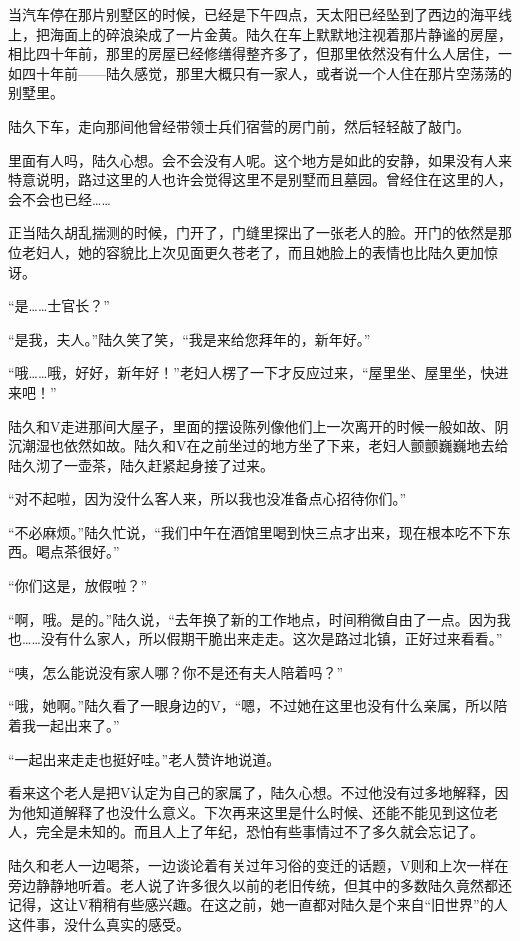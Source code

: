 当汽车停在那片别墅区的时候，已经是下午四点，天太阳已经坠到了西边的海平线上，把海面上的碎浪染成了一片金黄。陆久在车上默默地注视着那片静谧的房屋，相比四十年前，那里的房屋已经修缮得整齐多了，但那里依然没有什么人居住，一如四十年前——陆久感觉，那里大概只有一家人，或者说一个人住在那片空荡荡的别墅里。

陆久下车，走向那间他曾经带领士兵们宿营的房门前，然后轻轻敲了敲门。

里面有人吗，陆久心想。会不会没有人呢。这个地方是如此的安静，如果没有人来特意说明，路过这里的人也许会觉得这里不是别墅而且墓园。曾经住在这里的人，会不会也已经……

正当陆久胡乱揣测的时候，门开了，门缝里探出了一张老人的脸。开门的依然是那位老妇人，她的容貌比上次见面更久苍老了，而且她脸上的表情也比陆久更加惊讶。

“是……士官长？”

“是我，夫人。”陆久笑了笑，“我是来给您拜年的，新年好。”

“哦……哦，好好，新年好！”老妇人楞了一下才反应过来，“屋里坐、屋里坐，快进来吧！”

陆久和V走进那间大屋子，里面的摆设陈列像他们上一次离开的时候一般如故、阴沉潮湿也依然如故。陆久和V在之前坐过的地方坐了下来，老妇人颤颤巍巍地去给陆久沏了一壶茶，陆久赶紧起身接了过来。

“对不起啦，因为没什么客人来，所以我也没准备点心招待你们。”

“不必麻烦。”陆久忙说，“我们中午在酒馆里喝到快三点才出来，现在根本吃不下东西。喝点茶很好。”

“你们这是，放假啦？”

“啊，哦。是的。”陆久说，“去年换了新的工作地点，时间稍微自由了一点。因为我也……没有什么家人，所以假期干脆出来走走。这次是路过北镇，正好过来看看。”

“咦，怎么能说没有家人哪？你不是还有夫人陪着吗？”

“哦，她啊。”陆久看了一眼身边的V，“嗯，不过她在这里也没有什么亲属，所以陪着我一起出来了。”

“一起出来走走也挺好哇。”老人赞许地说道。

看来这个老人是把V认定为自己的家属了，陆久心想。不过他没有过多地解释，因为他知道解释了也没什么意义。下次再来这里是什么时候、还能不能见到这位老人，完全是未知的。而且人上了年纪，恐怕有些事情过不了多久就会忘记了。

陆久和老人一边喝茶，一边谈论着有关过年习俗的变迁的话题，V则和上次一样在旁边静静地听着。老人说了许多很久以前的老旧传统，但其中的多数陆久竟然都还记得，这让V稍稍有些感兴趣。在这之前，她一直都对陆久是个来自“旧世界”的人这件事，没什么真实的感受。

